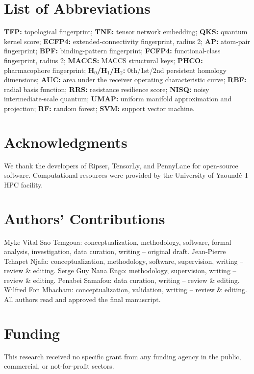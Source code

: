 \documentclass[11pt,a4paper]{article}
\begin{document}
\section*{List of Abbreviations}

\textbf{TFP:} topological fingerprint; \textbf{TNE:} tensor network embedding; \textbf{QKS:} quantum kernel score; \textbf{ECFP4:} extended-connectivity fingerprint, radius 2; \textbf{AP:} atom-pair fingerprint; \textbf{BPF:} binding-pattern fingerprint; \textbf{FCFP4:} functional-class fingerprint, radius 2; \textbf{MACCS:} MACCS structural keys; \textbf{PHCO:} pharmacophore fingerprint; \textbf{H$_0$/H$_1$/H$_2$:} 0th/1st/2nd persistent homology dimensions; \textbf{AUC:} area under the receiver operating characteristic curve; \textbf{RBF:} radial basis function; \textbf{RRS:} resistance resilience score; \textbf{NISQ:} noisy intermediate-scale quantum; \textbf{UMAP:} uniform manifold approximation and projection; \textbf{RF:} random forest; \textbf{SVM:} support vector machine.

\section*{Acknowledgments}

We thank the developers of Ripser, TensorLy, and PennyLane for open-source software. Computational resources were provided by the University of Yaound\'{e}~I HPC facility.

\section*{Authors' Contributions}

Myke Vital Sao Temgoua: conceptualization, methodology, software, formal analysis, investigation, data curation, writing -- original draft. Jean-Pierre Tchapet Njafa: conceptualization, methodology, software, supervision, writing -- review \& editing. Serge Guy Nana Engo: methodology, supervision, writing -- review \& editing. Penabei Samafou: data curation, writing -- review \& editing. Wilfred Fon Mbacham: conceptualization, validation, writing -- review \& editing. All authors read and approved the final manuscript.

\section*{Funding}

This research received no specific grant from any funding agency in the public, commercial, or not-for-profit sectors.
\end{document}
